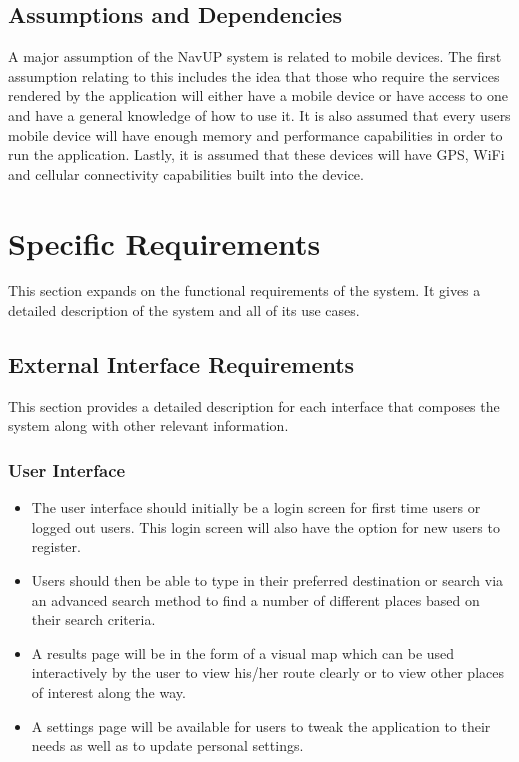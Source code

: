 \documentclass{article}
\begin{document}
	\subsection{Assumptions and Dependencies}
	A major assumption of the NavUP system is related to mobile devices. The first assumption relating to this includes the idea that those who require the services rendered by the application will either have a mobile device or have access to one and have a general knowledge of how to use it. It is also assumed that every users mobile device will have enough memory and performance capabilities in order to run the application. Lastly, it is assumed that these devices will have GPS, WiFi and cellular connectivity capabilities built into the device.
	
	\section{Specific Requirements}
	This section expands on the functional requirements of the system. It gives a detailed 	description of the system and all of its use cases.
	
	\subsection{External Interface Requirements}
		This section provides a detailed description for each interface that composes the system along with other relevant information.
 		\subsubsection{User Interface}
 		\begin{itemize}
 		\item The user interface should initially be a login screen for first time users or logged out users. This login screen will also have the option for new users to register.
 		\item Users should then be able to type in their preferred destination or search via an advanced search method to find a number of different places based on their search criteria.
 		\item A results page will be in the form of a visual map which can be used interactively by the user to view his/her route clearly or to view other places of interest along the way.
 		\item A settings page will be available for users to tweak the application to their needs as well as to update personal settings.\newline
 		\end{itemize}
 		
\end{document}
